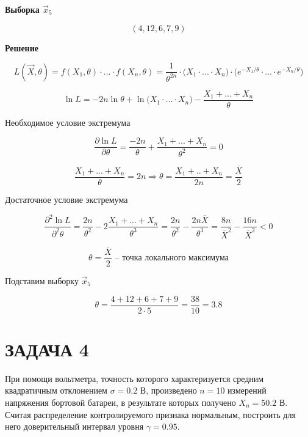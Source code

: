 \textbf{Выборка $\vec x_5$}

\begin{equation*}
    (4, 12, 6, 7, 9)
\end{equation*}

\textbf{Решение}

\begin{equation*}
    L(\vec X, \theta) = f(X_1, \theta) \cdot ... \cdot f(X_n, \theta) = \frac{1}{\theta^{2n}} \cdot \big( X_1 \cdot ... \cdot X_n \big) \cdot \big( e^{-X_1/\theta} \cdot ... \cdot e^{-X_n/\theta} \big)
\end{equation*}

\begin{equation*}
    \ln L = -2n \ln \theta + \ln \big(X_1 \cdot ... \cdot X_n \big) - \frac{X_1 + ... + X_n}{\theta}
\end{equation*}

Необходимое условие экстремума

\begin{equation*}
    \frac{\partial \ln L}{\partial \theta} = \frac{-2n}{\theta} + \frac{X_1 + ... + X_n}{\theta^2} = 0
\end{equation*}

\begin{equation*}
    \frac{X_1 + ... + X_n}{\theta} = 2n \Rightarrow \theta = \frac{X_1 + .. + X_n}{2n} = \frac{\overline X}{2}
\end{equation*}

Достаточное условие экстремума

\begin{equation*}
    \frac{\partial^2 \ln L}{\partial^2 \theta} = \frac{2n}{\theta^2} - 2 \frac{X_1 + ... + X_n}{\theta^3} = \frac{2n}{\theta^2} - \frac{2n \overline X}{\theta^3} = \frac{8n}{\overline X^2} - \frac{16n}{\overline X^2} < 0
\end{equation*}

\begin{equation*}
    \theta = \frac{\overline X}{2} \text{ -- точка локального максимума}
\end{equation*}

Подставим выборку $\vec x_5$

\begin{equation*}
    \theta = \frac{4 + 12 + 6 + 7 + 9}{2 \cdot 5} = \frac{38}{10} = 3.8
\end{equation*}

\section{ЗАДАЧА 4}

При помощи вольтметра, точность которого характеризуется средним квадратичным отклонением $\sigma = 0.2$ В, произведено $n = 10$ измерений напряжения бортовой батареи, в результате которых получено $X_n = 50.2$ В. Считая распределение контролируемого признака нормальным, построить для него доверительный интервал уровня $\gamma = 0.95$.
